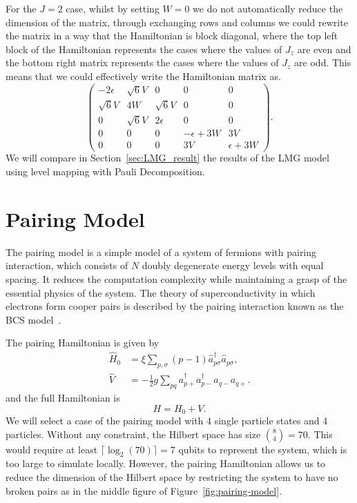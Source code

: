 For the $ J=2 $ case, whilst by setting $ W=0 $ we do not automatically reduce the dimension of the matrix, through exchanging rows and columns we could rewrite the matrix in a way that the
Hamiltonian is block diagonal, where the top left block of the Hamiltonian represents the cases where the values of $ J_z $ are even and the bottom right matrix represents the cases where the values of $ J_z $ are odd. This means that we could effectively write the Hamiltonian matrix as.
\begin{equation}
	\begin{pmatrix}	
	-2 \epsilon & \sqrt{6} V & 0 & 0 & 0 \\
	\sqrt{6} V & 4 W & \sqrt{6} V & 0 & 0 \\
	0 & \sqrt{6} V & 2 \epsilon & 0 & 0 \\
	0 & 0 & 0 & -\epsilon+3 W & 3 V \\
	0 & 0 & 0 & 3 V & \epsilon+3 W
	\end{pmatrix}.
\end{equation}
We will compare in Section~\ref{sec:LMG_result} the results of the LMG model using level mapping with Pauli Decomposition. 


\section{Pairing Model}
\label{sec:pairing_model}
The pairing model is a simple model of a system of fermions with pairing interaction, which consists of $ N $ doubly degenerate energy levels with equal spacing. It reduces the computation complexity while maintaining a grasp of the essential physics of the system. The theory of superconductivity in which electrons form cooper pairs is described by the pairing interaction known as the BCS model~\cite{Bardeen1957, Cooper1959}.

The pairing Hamiltonian is given by
\begin{align}
	\label{eq:pairing-hamiltonian}	
	\hat{H}_0&=\xi \sum_{p, \sigma}(p-1) \hat{a}_{p \sigma}^{\dagger} \hat{a}_{p \sigma}, \\
	\hat{V}&=-\frac{1}{2} g \sum_{p q} a_{p+}^{\dagger} a_{p-}^{\dagger} a_{q-} a_{q+}.
\end{align}
and the full Hamiltonian is \[ H = H_0 + V. \]
We will select a case of the pairing model with $ 4 $ single particle states and $ 4 $ particles. Without any constraint, the Hilbert space has size $\binom{8}{4} = 70 $. This would require at least $\lceil \log_2(70)\rceil = 7$ qubits to represent the system, which is too large to simulate locally. However, the pairing Hamiltonian allows us to reduce the dimension of the Hilbert space by restricting the system to have no broken pairs as in the middle figure of Figure~\ref{fig:pairing-model}. 


